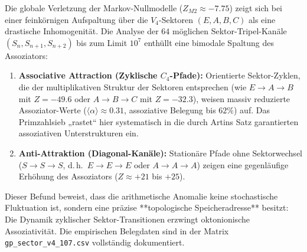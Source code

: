 \documentclass[11pt,a4paper]{article}
\begin{document}
	Die globale Verletzung der Markov-Nullmodelle ($Z_{M2} \approx -7.75$) zeigt sich bei einer feinkörnigen Aufspaltung über die $V_4$-Sektoren $(E, A, B, C)$ als eine drastische Inhomogenität. Die Analyse der $64$ möglichen Sektor-Tripel-Kanäle $(S_n, S_{n+1}, S_{n+2})$ bis zum Limit $10^7$ enthüllt eine bimodale Spaltung des Assoziators:
	
	\begin{enumerate}
		\item \textbf{Associative Attraction (Zyklische $C_4$-Pfade):} 
		Orientierte Sektor-Zyklen, die der multiplikativen Struktur der Sektoren entsprechen (wie $E \to A \to B$ mit $Z = -49.6$ oder $A \to B \to C$ mit $Z = -32.3$), weisen massiv reduzierte Assoziator-Werte ($\langle\alpha\rangle \approx 0.31$, assoziative Belegung bis $62\%$) auf. Das Primzahlsieb „rastet“ hier systematisch in die durch Artins Satz garantierten assoziativen Unterstrukturen ein.
		\item \textbf{Anti-Attraktion (Diagonal-Kanäle):} 
		Stationäre Pfade ohne Sektorwechsel ($S \to S \to S$, d.\,h.\ $E \to E \to E$ oder $A \to A \to A$) zeigen eine gegenläufige Erhöhung des Assoziators ($Z \approx +21$ bis $+25$).
	\end{enumerate}
	
	Dieser Befund beweist, dass die arithmetische Anomalie keine stochastische Fluktuation ist, sondern eine präzise **topologische Speicheradresse** besitzt: Die Dynamik zyklischer Sektor-Transitionen erzwingt oktonionische Assoziativität. Die empirischen Belegdaten sind in der Matrix \texttt{gp_sector_v4_107.csv} vollständig dokumentiert.
	
\end{document}

